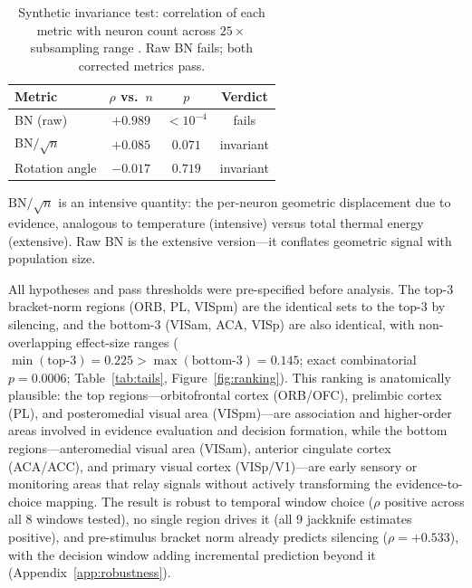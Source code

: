 \documentclass{article}
\begin{document}
\begin{table}[t]
\centering
\caption{Synthetic invariance test: correlation of each metric with neuron count across $25\times$ subsampling range \citep{dandi000028}. Raw BN fails; both corrected metrics pass.}
\label{tab:invariance}
\small
\begin{tabular}{lccc}
\toprule
Metric & $\rho$ vs.\ $n$ & $p$ & Verdict \\
\midrule
BN (raw) & $+0.989$ & $<10^{-4}$ & fails \\
BN$/\!\sqrt{n}$ & $+0.085$ & $0.071$ & invariant \\
Rotation angle & $-0.017$ & $0.719$ & invariant \\
\bottomrule
\end{tabular}
\end{table}

$\text{BN}/\!\sqrt{n}$ is an intensive quantity: the per-neuron geometric displacement due to evidence, analogous to temperature (intensive) versus total thermal energy (extensive). Raw BN is the extensive version---it conflates geometric signal with population size.

All hypotheses and pass thresholds were pre-specified before analysis. The top-3 bracket-norm regions (ORB, PL, VISpm) are the identical sets to the top-3 by silencing, and the bottom-3 (VISam, ACA, VISp) are also identical, with non-overlapping effect-size ranges ($\min(\text{top-3}) = 0.225 > \max(\text{bottom-3}) = 0.145$; exact combinatorial $p = 0.0006$; Table~\ref{tab:tails}, Figure~\ref{fig:ranking}). This ranking is anatomically plausible: the top regions---orbitofrontal cortex (ORB/OFC), prelimbic cortex (PL), and posteromedial visual area (VISpm)---are association and higher-order areas involved in evidence evaluation and decision formation, while the bottom regions---anteromedial visual area (VISam), anterior cingulate cortex (ACA/ACC), and primary visual cortex (VISp/V1)---are early sensory or monitoring areas that relay signals without actively transforming the evidence-to-choice mapping. The result is robust to temporal window choice ($\rho$ positive across all 8 windows tested), no single region drives it (all 9 jackknife estimates positive), and pre-stimulus bracket norm already predicts silencing ($\rho = +0.533$), with the decision window adding incremental prediction beyond it (Appendix~\ref{app:robustness}).
\end{document}
